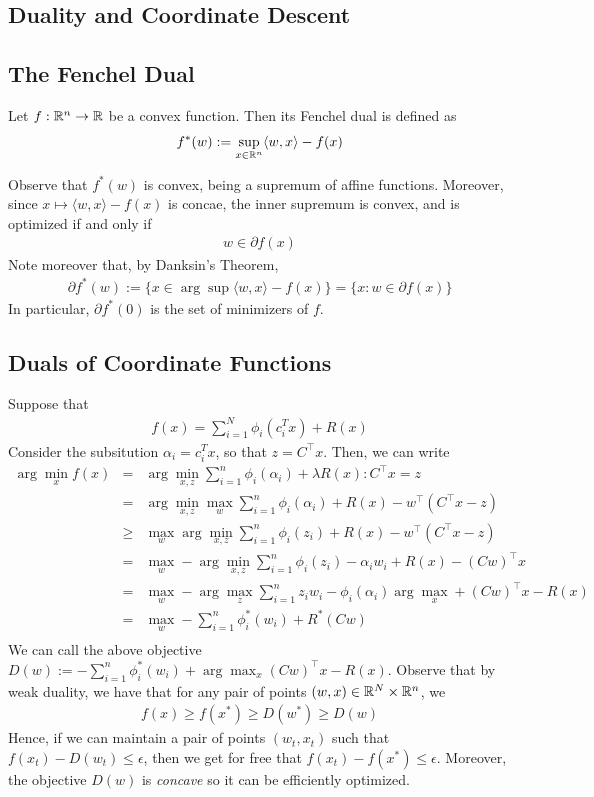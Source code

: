 \subsection{Duality and Coordinate Descent}
\subsection{The Fenchel Dual}
\begin{definition} Let $f: \mathbb{R}^n \to \mathbb{R}$ be a convex function. Then its Fenchel dual is defined as
\begin{eqnarray}
f^*(w) := \sup_{x \in \mathbb{R}^n} \langle w, x \rangle - f(x)
\end{eqnarray}
\end{definition}
Observe that $f^*(w)$ is convex, being a supremum of affine functions. Moreover, since $x \mapsto \langle w, x \rangle - f(x)$ is concae, the inner supremum is convex, and is optimized if and only if 
\begin{eqnarray}
w \in \partial f(x)
\end{eqnarray}
Note moreover that, by Danksin's Theorem, 
\begin{eqnarray}
\partial f^*(w) := \{x \in \arg\sup \langle w, x \rangle - f(x)\} = \{x: w \in \partial f(x)\}
\end{eqnarray}
In particular, $\partial f^*(0)$ is the set of minimizers of $f$. 
\subsection{Duals of Coordinate Functions}
Suppose that 
\begin{eqnarray}
f(x) = \sum_{i=1}^N \phi_i(c_i^Tx) + R(x)
\end{eqnarray}
Consider the subsitution $\alpha_i = c_i^Tx$, so that $z = C^\top x$. Then, we can write 
\begin{eqnarray*}
\arg\min_{x}f(x) &=&  \arg\min_{x,z}  \sum_{i=1}^n \phi_i(\alpha_i) + \lambda R(x) : C^\top x = z \\
&=&  \arg\min_{x,z}  \max_{w} \sum_{i=1}^n \phi_i(\alpha_i) +  R(x) - w^{\top}(C^\top x - z ) \\
&\ge&   \max_{w} \arg\min_{x,z} \sum_{i=1}^n \phi_i(z_i) +  R(x) - w^{\top}(C^\top x - z ) \\
&=&   \max_{w} -\arg\min_{x,z} \sum_{i=1}^n \phi_i(z_i) - \alpha_iw_i + R(x) - (Cw)^{\top} x \\
&=&   \max_{w} -\arg\max_{z} \sum_{i=1}^n z_iw_i -  \phi_i(\alpha_i)  \arg\max_{x}+ (Cw)^{\top} x - R(x) \\
&=&   \max_{w} - \sum_{i=1}^n \phi_i^*(w_i) +  R^*(Cw) \\
\end{eqnarray*}
We can call the above objective $D(w):= - \sum_{i=1}^n \phi_i^*(w_i) +  \arg\max_{x} (Cw)^{\top} x - R(x)$. Observe that by weak duality, we have that for any pair of points $(w,x) \in \mathbb{R}^N \times \mathbb{R}^n$, we
\begin{eqnarray}
f(x) \ge f(x^*) \ge D(w^*) \ge D(w)
\end{eqnarray}
Hence, if we can maintain a pair of points $(w_t,x_t)$ such that $f(x_t) - D(w_t) \le \epsilon$, then we get for free that $f(x_t) - f(x^*) \le \epsilon$. Moreover, the objective $D(w)$ is \emph{concave} so it can be efficiently optimized.
